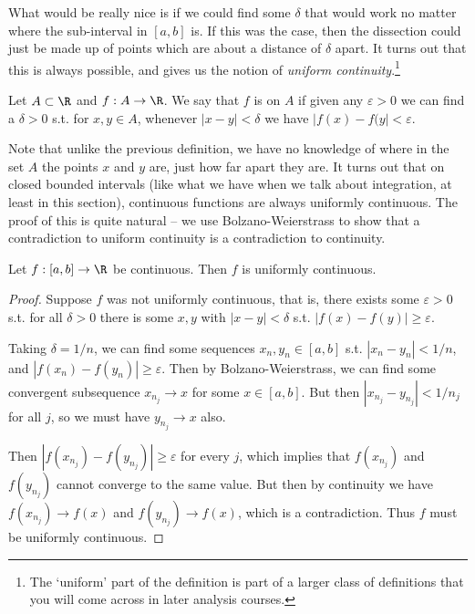 What would be really nice is if we could find some $\delta$ that would work no matter where the sub-interval in $[a, b]$ is. If this was the case, then the dissection could just be made up of points which are about a distance of $\delta$ apart. It turns out that this is always possible, and gives us the notion of \emph{uniform continuity}.\footnote{The `uniform' part of the definition is part of a larger class of definitions that you will come across in later analysis courses.}

\begin{definition}
	Let $A \subset \R$ and $f: A \rightarrow \R$. We say that $f$ is  on $A$ if given any $\varepsilon  >0$ we can find a $\delta> 0$ s.t. for $x, y \in A$, whenever $|x - y| < \delta$ we have $|f(x) - f(y| < \varepsilon$.
\end{definition}

Note that unlike the previous definition, we have no knowledge of where in the set $A$ the points $x$ and $y$ are, just how far apart they are. It turns out that on closed bounded intervals (like what we have when we talk about integration, at least in this section), continuous functions are always uniformly continuous.
The proof of this is quite natural -- we use Bolzano-Weierstrass to show that a contradiction to uniform continuity is a contradiction to continuity.

\begin{theorem}
	Let $f: [a, b] \rightarrow \R$ be continuous. Then $f$ is uniformly continuous.
\end{theorem}
\begin{proof}
	Suppose $f$ was not uniformly continuous, that is, there exists some $\varepsilon > 0$ s.t. for all $\delta > 0$ there is some $x, y$ with $|x - y| < \delta$ s.t. $|f(x) - f(y)| \geq \varepsilon$.

	Taking $\delta = 1/n$, we can find some sequences $x_n, y_n \in [a, b]$ s.t. $|x_n - y_n| < 1/n$, and $|f(x_n) - f(y_n)| \geq \varepsilon$. Then by Bolzano-Weierstrass, we can find some convergent subsequence $x_{n_j} \rightarrow x$ for some $x \in [a, b]$. But then $|x_{n_j} - y_{n_j}| < 1/n_j$ for all $j$, so we must have $y_{n_j} \rightarrow x$ also.

	Then $|f(x_{n_j}) - f(y_{n_j})| \geq \varepsilon$ for every $j$, which implies that $f(x_{n_j})$ and $f(y_{n_j})$ cannot converge to the same value. But then by continuity we have $f(x_{n_j}) \rightarrow f(x)$ and $f(y_{n_j}) \rightarrow f(x)$, which is a contradiction. Thus $f$ must be uniformly continuous.
\end{proof}

